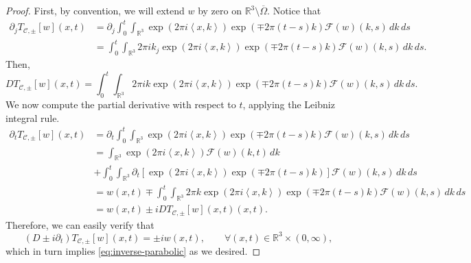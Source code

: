 \documentclass[10pt,a4paper]{amsart}
\def\R{\mathbb{R}}
\newcommand{\expo}[1]{\exp\left( #1\right)}
\newcommand{\fourier}[1]{\mathcal{F}\left( #1 \right)}
\newcommand{\inner}[1]{\left\langle #1 \right\rangle}
\begin{document}
\begin{proof}
First, by convention, we will extend $w$ by zero on $\mathbb{R}^3\setminus \overline{\Omega}$. Notice that
    \begin{align*}
        \partial_jT_{\mathscr{C},\pm}[w](x,t)&=\partial_j\int_0^t\int_{\R^3}\expo{2\pi i\inner{x,k}}\expo{\mp2\pi(t-s)k}\fourier{w}(k,s)\, dk\, ds\\
        &=\int_0^t\int_{\R^3}2\pi ik_j\expo{2\pi i\inner{x,k}}\expo{\mp 2\pi(t-s)k}\fourier{w}(k,s)\, dk\, ds.
    \end{align*}
    Then,
    \[DT_{\mathscr{C},\pm}[w](x,t)=\int_0^t\int_{\R^3}2\pi ik\expo{2\pi i\inner{x,k}}\expo{\mp 2\pi(t-s)k}\fourier{w}(k,s)\, dk\,ds.\]
    We now compute the partial derivative with respect to $t$, applying the Leibniz integral rule.
    \begin{align*}
        \partial_t T_{\mathscr{C},\pm}[w](x,t)&=\partial_t\int_0^t\int_{\R^3}\expo{2\pi i\inner{x,k}}\expo{\mp 2\pi(t-s)k}\fourier{w}(k,s)\,dk\,ds\\
        &=\int_{\R^3}\expo{2\pi i\inner{x,k}}\fourier{w}(k,t)\, dk\\   &+\int_0^t\int_{\R^3}\partial_t\left[\expo{2\pi i\inner{x,k}}\expo{\mp 2\pi(t-s)k}\right]\fourier{w}(k,s)\, dk\,ds\\
        &=
        w(x,t)\mp \int_0^t\int_{\R^3}2\pi k\expo{2\pi i\inner{x,k}}\expo{\mp 2\pi(t-s)k}\fourier{w}(k,s)\,dk\, ds\\
        &=w(x,t)\pm iD T_{\mathscr{C},\pm}[w](x,t)(x,t).
    \end{align*}
    Therefore, we can easily verify that 
    $$(D\pm i\partial_t)T_{\mathscr{C},\pm}[w](x,t)=\pm iw(x,t), \qquad \forall (x,t)\in \R^3\times (0,\infty),$$
which in turn implies \eqref{eq:inverse-parabolic} as we desired.
\end{proof}
\end{document}
